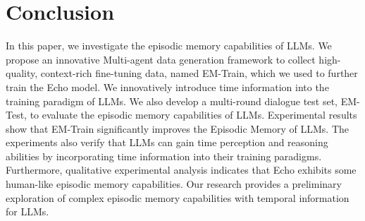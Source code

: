 
\section{Conclusion}

In this paper, we investigate the episodic memory capabilities of LLMs. We propose an innovative Multi-agent data generation framework to collect high-quality, context-rich fine-tuning data, named EM-Train, which we used to further train the Echo model. We innovatively introduce time information into the training paradigm of LLMs. We also develop a multi-round dialogue test set, EM-Test, to evaluate the episodic memory capabilities of LLMs. Experimental results show that EM-Train significantly improves the Episodic Memory of LLMs. The experiments also verify that LLMs can gain time perception and reasoning abilities by incorporating time information into their training paradigms. Furthermore, qualitative experimental analysis indicates that Echo exhibits some human-like episodic memory capabilities. Our research provides a preliminary exploration of complex episodic memory capabilities with temporal information for LLMs.